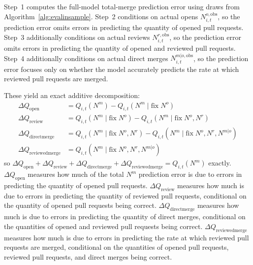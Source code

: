\documentclass[source/paper/main.tex]{subfiles}
\begin{document}
Step~1 computes the full-model total-merge prediction error using draws from Algorithm~\ref{alg:evalinsample}.
Step~2 conditions on actual opens $N_{i,t}^{o,\mathrm{obs}}$, so the prediction error omits errors in predicting the quantity of opened pull requests.
Step~3 additionally conditions on actual reviews $N_{i,t}^{r,\mathrm{obs}}$, so the prediction error omits errors in predicting the quantity of opened and reviewed pull requests.
Step~4 additionally conditions on actual direct merges $N_{i,t}^{m|o,\mathrm{obs}}$, so the prediction error focuses only on whether the model accurately predicts the rate at which reviewed pull requests are merged.

These yield an exact additive decomposition:
\begin{align*}
\Delta Q_{\mathrm{open}} &= Q_{i,t}(N^m) - Q_{i,t}(N^m \mid \mathrm{fix}\;N^o) \\
\Delta Q_{\mathrm{review}} &= Q_{i,t}(N^m \mid \mathrm{fix}\;N^o) - Q_{i,t}(N^m \mid \mathrm{fix}\;N^o,N^r) \\
\Delta Q_{\mathrm{direct merge}} &= Q_{i,t}(N^m \mid \mathrm{fix}\;N^o,N^r) - Q_{i,t}(N^m \mid \mathrm{fix}\;N^o,N^r,N^{m|o}) \\
\Delta Q_{\mathrm{reviewed merge}} &= Q_{i,t}(N^m \mid \mathrm{fix}\;N^o,N^r,N^{m|o})
\end{align*}
so $\Delta Q_{\mathrm{open}} + \Delta Q_{\mathrm{review}} + \Delta Q_{\mathrm{direct merge}} + \Delta Q_{\mathrm{reviewed merge}} = Q_{i,t}(N^m)$ exactly.
$\Delta Q_{\mathrm{open}}$ measures how much of the total $N^m$ prediction error is due to errors in predicting the quantity of opened pull requests.
$\Delta Q_{\mathrm{review}}$ measures how much is due to errors in predicting the quantity of reviewed pull requests, conditional on the quantity of opened pull requests being correct.
$\Delta Q_{\mathrm{direct merge}}$ measures how much is due to errors in predicting the quantity of direct merges, conditional on the quantities of opened and reviewed pull requests being correct.
$\Delta Q_{\mathrm{reviewed merge}}$ measures how much is due to errors in predicting the rate at which reviewed pull requests are merged, conditional on the quantities of opened pull requests, reviewed pull requests, and direct merges being correct.

\end{document}

